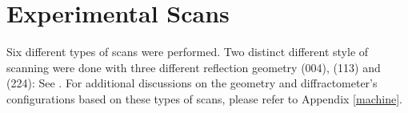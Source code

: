 \section{Experimental Scans}

Six different types of scans were performed.  Two distinct different style of scanning were done with three different reflection geometry (004), (113) and (224):  See .  For additional discussions on the geometry and diffractometer's configurations based on these types of scans, please refer to Appendix \ref{machine}.

%
%
%
%
%
%
%
%


